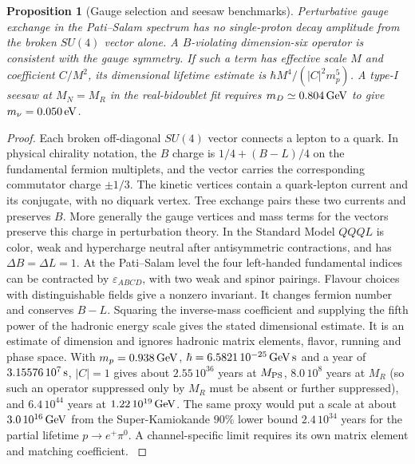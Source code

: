 \documentclass[aps,pra,onecolumn,superscriptaddress,nofootinbib,10pt]{revtex4-2}
\newtheorem{proposition}[theorem]{Proposition}
\theoremstyle{definition}
\theoremstyle{remark}
\begin{document}
\begin{proposition}[Gauge selection and seesaw benchmarks]\label{ub:decay}
Perturbative gauge exchange in the Pati--Salam spectrum has no
single-proton decay amplitude from the broken $SU(4)$ vector alone.
A $B$-violating dimension-six operator is consistent with the
gauge symmetry. If such a term has effective scale $M$ and coefficient
$C/M^2$, its dimensional lifetime estimate is
$\hbar M^4/(|C|^2m_p^5)$. A type-I seesaw at $M_N=M_R$ in the real-bidoublet
fit requires $m_D\simeq0.804\,{\rm GeV}$ to give $m_\nu=0.050\,{\rm eV}$.
\end{proposition}
\begin{proof}
Each broken off-diagonal $SU(4)$ vector connects a lepton to a quark.
In physical chirality notation, the $B$ charge is $1/4+(B-L)/4$ on
the fundamental fermion multiplets, and the vector carries the
corresponding commutator charge $\pm1/3$. The kinetic vertices contain
a quark-lepton current and its conjugate, with no diquark vertex.
Tree exchange pairs these two currents and preserves $B$.
More generally the gauge vertices and mass terms for the vectors
preserve this charge in perturbation theory. In the Standard Model
$QQQL$ is color, weak and hypercharge neutral after antisymmetric
contractions, and has $\Delta B=\Delta L=1$. At the Pati--Salam level
the four left-handed fundamental indices can be contracted by
$\varepsilon_{ABCD}$, with two weak and spinor pairings. Flavour
choices with distinguishable fields give a nonzero invariant. It changes
fermion number and conserves $B-L$.
Squaring the inverse-mass coefficient and supplying the fifth power of
the hadronic energy scale gives the stated dimensional estimate. It is
an estimate of dimension and ignores hadronic matrix elements, flavor,
running and phase space. With $m_p=0.938\,{\rm GeV}$,
$\hbar=6.5821\,10^{-25}\,{\rm GeV\,s}$ and a year of
$3.15576\,10^7\,{\rm s}$, $|C|=1$ gives about $2.55\,10^{36}$ years at
$M_{\rm PS}$, $8.0\,10^8$ years at $M_R$ (so such an operator suppressed only by $M_R$ must be absent or further
suppressed), and $6.4\,10^{44}$ years
at $1.22\,10^{19}\,{\rm GeV}$. The same proxy would put a scale at
about $3.0\,10^{16}\,{\rm GeV}$ from the Super-Kamiokande
$90\%$ lower bound $2.4\,10^{34}$ years for the partial lifetime
$p\to e^+\pi^0$. A channel-specific limit requires its own matrix element
and matching coefficient. \cite{ub:takenaka}


\end{proof}
\end{document}
